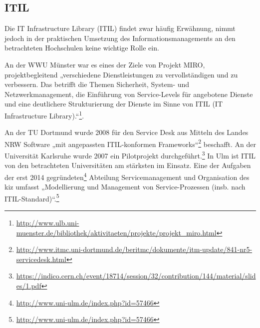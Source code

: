 \subsection{ITIL}
Die IT Infrastructure Library (ITIL) findet zwar häufig Erwähnung, nimmt jedoch in der praktischen Umsetzung des Informationsmanagements an den betrachteten Hochschulen keine wichtige Rolle ein.

An der WWU Münster war es eines der Ziele von Projekt MIRO, projektbegleitend „verschiedene Dienstleistungen zu vervollständigen und zu verbessern. Das betrifft die Themen Sicherheit, System- und Netzwerkmanagement, die Einführung von Service-Levels für angebotene Dienste und eine deutlichere Strukturierung der Dienste im Sinne von ITIL (IT Infrastructure Library).“\footnote{\url{http://www.ulb.uni-muenster.de/bibliothek/aktivitaeten/projekte/projekt_miro.html}}.

An der TU Dortmund wurde 2008 für den Service Desk aus Mitteln des Landes NRW Software „mit angepassten ITIL-konformen Frameworks“\footnote{\url{http://www.itmc.uni-dortmund.de/beritmc/dokumente/itm-update/841-nr5-servicedesk.html}} beschafft.
An der Universität Karlsruhe wurde 2007 ein Pilotprojekt durchgeführt.\footnote{\url{https://indico.cern.ch/event/18714/session/32/contribution/144/material/slides/1.pdf}}
In Ulm ist ITIL von den betrachteten Universitäten am stärksten im Einsatz. Eine der Aufgaben der erst 2014 gegründeten\footnote{\url{http://www.uni-ulm.de/index.php?id=57466}} Abteilung Servicemanagement und Organisation des kiz umfasst „Modellierung und Management von Service-Prozessen (insb. nach ITIL-Standard)“.\footnote{\url{http://www.uni-ulm.de/index.php?id=57466}}
